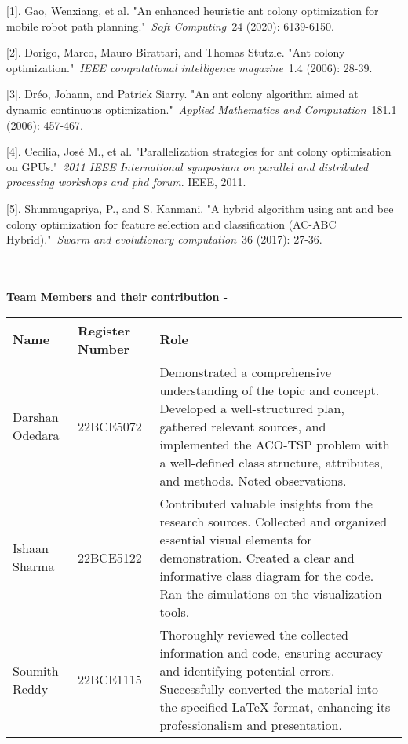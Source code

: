 \documentclass[
]{article}
\begin{document}
\textbf{\hfill\break}
{[}1{]}. Gao, Wenxiang, et al. "An enhanced heuristic ant colony
optimization for mobile robot path planning."~\emph{Soft Computing}~24
(2020): 6139-6150.

\vspace{0.5cm} %

{[}2{]}. Dorigo, Marco, Mauro Birattari, and Thomas Stutzle. "Ant colony
optimization."~\emph{IEEE computational intelligence magazine}~1.4
(2006): 28-39.

\vspace{0.5cm}

{[}3{]}. Dréo, Johann, and Patrick Siarry. "An ant colony algorithm
aimed at dynamic continuous optimization."~\emph{Applied Mathematics and
Computation}~181.1 (2006): 457-467.

\vspace{0.5cm}

{[}4{]}. Cecilia, José M., et al. "Parallelization strategies for ant
colony optimisation on GPUs."~\emph{2011 IEEE International symposium on
parallel and distributed processing workshops and phd forum}. IEEE,
2011.

\vspace{0.5cm}

{[}5{]}. Shunmugapriya, P., and S. Kanmani. "A hybrid algorithm using
ant and bee colony optimization for feature selection and classification
(AC-ABC Hybrid)."~\emph{Swarm and evolutionary computation}~36 (2017):
27-36.
\\
\\
\\

\begin{center}
{\Large {\textbf{ Team Members and their contribution - }}}
\end{center}
\vspace{0.5cm}
\begin{center}
\begin{tabular}{|p{3cm}|p{2cm}|p{7cm}|}
\hline
Name & Register Number & Role \\
\hline
Darshan Odedara & 22BCE5072 & Demonstrated a comprehensive understanding of the topic and concept. Developed a well-structured plan, gathered relevant sources, and implemented the ACO-TSP problem with a well-defined class structure, attributes, and methods. Noted observations.\\
Ishaan Sharma & 22BCE5122 & Contributed valuable insights from the research sources. Collected and organized essential visual elements for demonstration. Created a clear and informative class diagram for the code. Ran the simulations on the visualization tools. \\
Soumith Reddy & 22BCE1115 & Thoroughly reviewed the collected information and code, ensuring accuracy and identifying potential errors. Successfully converted the material into the specified LaTeX format, enhancing its professionalism and presentation. \\
\hline
\end{tabular}
\end{center}
\end{document}
